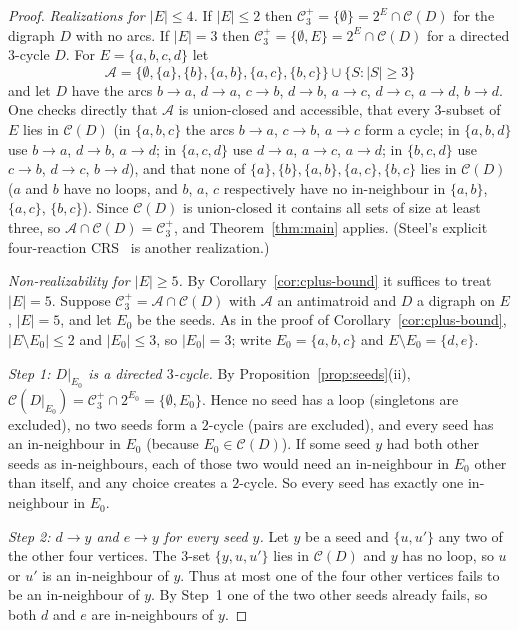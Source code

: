 \documentclass[11pt,a4paper]{article}
\theoremstyle{plain}
\theoremstyle{definition}
\theoremstyle{remark}
\newcommand{\cA}{\mathcal{A}}
\newcommand{\cC}{\mathcal{C}}
\newcommand{\pw}[1]{2^{#1}}
\newcommand{\Cplus}[1]{\cC^{+}_{#1}}
\begin{document}
\begin{proof}
\emph{Realizations for $|E|\le4$.} If $|E|\le2$ then $\Cplus{3}=\{\emptyset\}=\pw{E}\cap\cC(D)$ for the digraph $D$ with no arcs. If $|E|=3$ then $\Cplus{3}=\{\emptyset,E\}=\pw{E}\cap\cC(D)$ for a directed $3$-cycle $D$. For $E=\{a,b,c,d\}$ let
\[
\cA=\bigl\{\emptyset,\{a\},\{b\},\{a,b\},\{a,c\},\{b,c\}\bigr\}\cup\{S:|S|\ge3\}
\]
and let $D$ have the arcs $b\to a$, $d\to a$, $c\to b$, $d\to b$, $a\to c$, $d\to c$, $a\to d$, $b\to d$. One checks directly that $\cA$ is union-closed and accessible, that every $3$-subset of $E$ lies in $\cC(D)$ (in $\{a,b,c\}$ the arcs $b\to a$, $c\to b$, $a\to c$ form a cycle; in $\{a,b,d\}$ use $b\to a$, $d\to b$, $a\to d$; in $\{a,c,d\}$ use $d\to a$, $a\to c$, $a\to d$; in $\{b,c,d\}$ use $c\to b$, $d\to c$, $b\to d$), and that none of $\{a\},\{b\},\{a,b\},\{a,c\},\{b,c\}$ lies in $\cC(D)$ ($a$ and $b$ have no loops, and $b$, $a$, $c$ respectively have no in-neighbour in $\{a,b\}$, $\{a,c\}$, $\{b,c\}$). Since $\cC(D)$ is union-closed it contains all sets of size at least three, so $\cA\cap\cC(D)=\Cplus{3}$, and Theorem~\ref{thm:main} applies. (Steel's explicit four-reaction CRS~\cite[Section~3.3]{steel2023interior} is another realization.)

\emph{Non-realizability for $|E|\ge5$.} By Corollary~\ref{cor:cplus-bound} it suffices to treat $|E|=5$. Suppose $\Cplus{3}=\cA\cap\cC(D)$ with $\cA$ an antimatroid and $D$ a digraph on $E$, $|E|=5$, and let $E_0$ be the seeds. As in the proof of Corollary~\ref{cor:cplus-bound}, $|E\setminus E_0|\le2$ and $|E_0|\le3$, so $|E_0|=3$; write $E_0=\{a,b,c\}$ and $E\setminus E_0=\{d,e\}$.

\emph{Step 1: $D|_{E_0}$ is a directed $3$-cycle.} By Proposition~\ref{prop:seeds}(ii), $\cC(D|_{E_0})=\Cplus{3}\cap\pw{E_0}=\{\emptyset,E_0\}$. Hence no seed has a loop (singletons are excluded), no two seeds form a $2$-cycle (pairs are excluded), and every seed has an in-neighbour in $E_0$ (because $E_0\in\cC(D)$). If some seed $y$ had both other seeds as in-neighbours, each of those two would need an in-neighbour in $E_0$ other than itself, and any choice creates a $2$-cycle. So every seed has exactly one in-neighbour in $E_0$.

\emph{Step 2: $d\to y$ and $e\to y$ for every seed $y$.} Let $y$ be a seed and $\{u,u'\}$ any two of the other four vertices. The $3$-set $\{y,u,u'\}$ lies in $\cC(D)$ and $y$ has no loop, so $u$ or $u'$ is an in-neighbour of $y$. Thus at most one of the four other vertices fails to be an in-neighbour of $y$. By Step~1 one of the two other seeds already fails, so both $d$ and $e$ are in-neighbours of $y$.


\end{proof}
\end{document}
